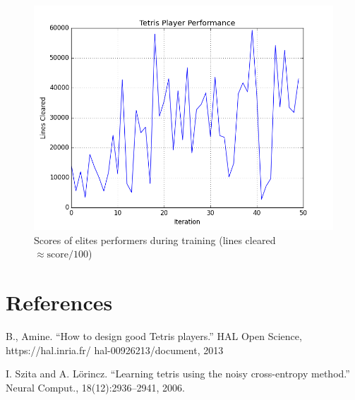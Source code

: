 \documentclass[12pt,letterpaper]{article}
\begin{document}
\begin{figure}[h!]
  \centering
  \includegraphics[width=0.7\linewidth]{performance.png}
  \caption{Scores of elites performers during training (lines cleared $\approx \text{score}/100$)}
\end{figure}

\section{References}

\begin{enumerate}[label={[\arabic*]}]
  \item B., Amine. “How to design good Tetris players.” HAL Open Science, https://hal.inria.fr/ hal-00926213/document, 2013

  \item I. Szita and A. Lörincz. “Learning tetris using the noisy cross-entropy method.” Neural Comput., 18(12):2936–2941, 2006.
\end{enumerate}
\end{document}

